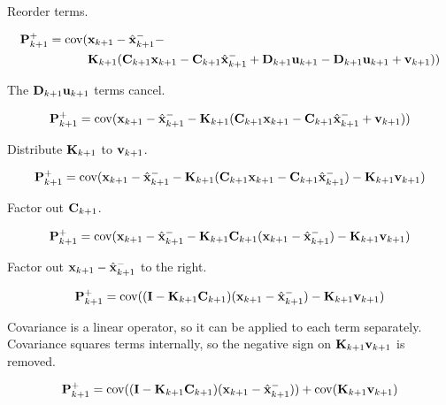 Reorder terms.

\begin{align*}
  \mathbf{P}_{k+1}^+ = \operatorname{cov}(&\mathbf{x}_{k+1} - \hat{\mathbf{x}}_{k+1}^- - \\
    &\mathbf{K}_{k+1}(\mathbf{C}_{k+1} \mathbf{x}_{k+1} -
      \mathbf{C}_{k+1} \hat{\mathbf{x}}_{k+1}^- + \mathbf{D}_{k+1} \mathbf{u}_{k+1} -
      \mathbf{D}_{k+1}\mathbf{u}_{k+1} + \mathbf{v}_{k+1}))
\end{align*}

The $\mathbf{D}_{k+1}\mathbf{u}_{k+1}$ terms cancel.

\begin{equation*}
  \mathbf{P}_{k+1}^+ = \operatorname{cov}(\mathbf{x}_{k+1} - \hat{\mathbf{x}}_{k+1}^- -
    \mathbf{K}_{k+1}(\mathbf{C}_{k+1}\mathbf{x}_{k+1} -
    \mathbf{C}_{k+1} \hat{\mathbf{x}}_{k+1}^- + \mathbf{v}_{k+1}))
\end{equation*}

Distribute $\mathbf{K}_{k+1}$ to $\mathbf{v}_{k+1}$.

\begin{equation*}
  \mathbf{P}_{k+1}^+ = \operatorname{cov}(\mathbf{x}_{k+1} - \hat{\mathbf{x}}_{k+1}^- -
    \mathbf{K}_{k+1}(\mathbf{C}_{k+1}\mathbf{x}_{k+1} -
    \mathbf{C}_{k+1} \hat{\mathbf{x}}_{k+1}^-) - \mathbf{K}_{k+1}\mathbf{v}_{k+1})
\end{equation*}

Factor out $\mathbf{C}_{k+1}$.

\begin{equation*}
  \mathbf{P}_{k+1}^+ = \operatorname{cov}(\mathbf{x}_{k+1} - \hat{\mathbf{x}}_{k+1}^- -
    \mathbf{K}_{k+1}\mathbf{C}_{k+1}(\mathbf{x}_{k+1} - \hat{\mathbf{x}}_{k+1}^-) -
    \mathbf{K}_{k+1}\mathbf{v}_{k+1})
\end{equation*}

Factor out $\mathbf{x}_{k+1} - \hat{\mathbf{x}}_{k+1}^-$ to the right.

\begin{equation*}
  \mathbf{P}_{k+1}^+ = \operatorname{cov}((\mathbf{I} - \mathbf{K}_{k+1}\mathbf{C}_{k+1})
    (\mathbf{x}_{k+1} - \hat{\mathbf{x}}_{k+1}^-) - \mathbf{K}_{k+1}\mathbf{v}_{k+1})
\end{equation*}

Covariance is a linear operator, so it can be applied to each term separately.
Covariance squares terms internally, so the negative sign on
$\mathbf{K}_{k+1}\mathbf{v}_{k+1}$ is removed.

\begin{equation*}
  \mathbf{P}_{k+1}^+ = \operatorname{cov}((\mathbf{I} - \mathbf{K}_{k+1}\mathbf{C}_{k+1})
    (\mathbf{x}_{k+1} - \hat{\mathbf{x}}_{k+1}^-)) + \operatorname{cov}(\mathbf{K}_{k+1}\mathbf{v}_{k+1})
\end{equation*}

